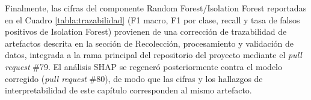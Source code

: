 \enlargethispage{\baselineskip}

Finalmente, las cifras del componente Random Forest/Isolation Forest reportadas en el Cuadro \ref{tabla:trazabilidad} (F1 macro, F1 por clase, recall y tasa de falsos positivos de Isolation Forest) provienen de una corrección de trazabilidad de artefactos descrita en la sección de Recolección, procesamiento y validación de datos, integrada a la rama principal del repositorio del proyecto mediante el \textit{pull request} \#79. El análisis SHAP se regeneró posteriormente contra el modelo corregido (\textit{pull request} \#80), de modo que las cifras y los hallazgos de interpretabilidad de este capítulo corresponden al mismo artefacto.
